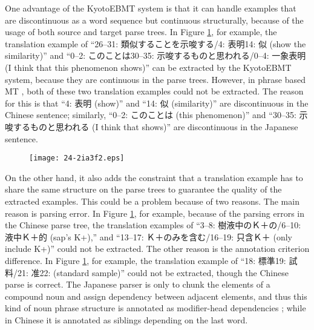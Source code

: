 \documentclass[english]{jnlp_1.4}
\begin{document}
One advantage of the KyotoEBMT system is that it can handle examples that are discontinuous
as a word sequence but continuous structurally, because of the usage of both
source and target parse trees. In Figure \ref{fig:motivation}, for example, the translation
example of ``26--31: 類似することを示唆する/4: 表明14: 似 (show the similarity)'' and 
``0--2: このことは30--35: 示唆するものと思われる/0--4: 一象表明 (I think that this phenomenon shows)'' 
can be extracted by the KyotoEBMT system, because they are continuous in the parse trees.
However, in phrase based MT \cite{koehn-EtAl:2007:PosterDemo}, both of these two translation examples 
could not be extracted. The reason for this is that ``4: 表明 (show)'' and ``14: 似 (similarity)'' are discontinuous
in the Chinese sentence; similarly, ``0--2: このことは (this phenomenon)'' and ``30--35: 示唆するものと思われる 
(I think that shows)'' are discontinuous in the Japanese sentence.

\begin{figure}[t]
\begin{center}
\texttt{[image: 24-2ia3f2.eps]}
\end{center}
\label{fig:motivation}
\end{figure}

On the other hand, it also adds the constraint that a translation example has to share the 
same structure on the parse trees to guarantee the quality of the extracted examples. 
This could be a problem because of two reasons. The main reason is parsing 
error. In Figure \ref{fig:motivation}, for example, because of the parsing errors in the Chinese
parse tree, the translation examples of ``3--8: 樹液中のＫ＋の/6--10: 液中Ｋ＋的 (sap's K+),'' and 
``13--17: Ｋ＋のみを含む/16--19: 只含Ｋ＋ (only include K+)'' could not be extracted. The other reason is the annotation criterion 
difference. In Figure \ref{fig:motivation}, for example, the translation example of ``18: 標準19: 試料/21: 准22: 
(standard sample)'' could not be extracted, {though the Chinese parse is correct. 
The Japanese parser is only to chunk the elements of a compound noun and assign dependency between 
adjacent elements, and thus this kind of noun phrase structure is annotated as modifier-head 
dependencies \cite{kawahara-kurohashi:2006:HLT-NAACL06-Main};} while
in Chinese it is annotated as siblings depending on the last word.
\end{document}
